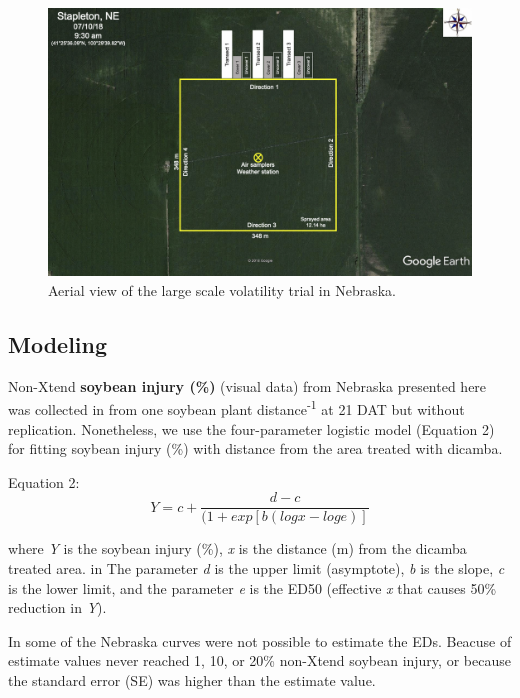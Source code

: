 \documentclass[]{article}
\begin{document}
\begin{figure}[h]

{\centering \includegraphics[width=1\linewidth]{nebraska} 

}

\caption{Aerial view of the large scale volatility trial in Nebraska.}\label{fig:unnamed-chunk-61}
\end{figure}

\pagebreak
\newpage

\subsection{Modeling}\label{modeling-3}

Non-Xtend \textbf{soybean injury (\%)} (visual data) from Nebraska
presented here was collected in from one soybean plant
distance\textsuperscript{-1} at 21 DAT but without replication.
Nonetheless, we use the four-parameter logistic model (Equation 2) for
fitting soybean injury (\%) with distance from the area treated with
dicamba.

Equation 2: \[Y= c + \frac{d - c}{(1 + exp[b(logx - loge)]} \]

where \emph{Y} is the soybean injury (\%), \emph{x} is the distance (m)
from the dicamba treated area. in The parameter \emph{d} is the upper
limit (asymptote), \emph{b} is the slope, \emph{c} is the lower limit,
and the parameter \emph{e} is the ED50 (effective \emph{x} that causes
50\% reduction in \emph{Y}).

In some of the Nebraska curves were not possible to estimate the EDs.
Beacuse of estimate values never reached 1, 10, or 20\% non-Xtend
soybean injury, or because the standard error (SE) was higher than the
estimate value.
\end{document}
